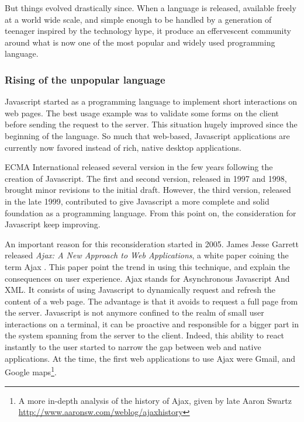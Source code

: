 But things evolved drastically since.
When a language is released, available freely at a world wide scale, and simple enough to be handled by a generation of teenager inspired by the technology hype, it produce an effervescent community around what is now one of the most popular and widely used programming language.

\subsubsection{Rising of the unpopular language}


Javascript started as a programming language to implement short interactions on web pages.
The best usage example was to validate some forms on the client before sending the request to the server.
This situation hugely improved since the beginning of the language.
So much that web-based, Javascript applications are currently now favored instead of rich, native desktop applications.

ECMA International released several version in the few years following the creation of Javascript.
The first and second version, released in 1997 and 1998, brought minor revisions to the initial draft.
However, the third version, released in the late 1999, contributed to give Javascript a more complete and solid foundation as a programming language.
From this point on, the consideration for Javascript keep improving.

An important reason for this reconsideration started in 2005.
James Jesse Garrett released \textit{Ajax: A New Approach to Web Applications}, a white paper coining the term Ajax \cite{Garrett2005}.
This paper point the trend in using this technique, and explain the consequences on user experience.
Ajax stands for Asynchronous Javascript And XML.
It consists of using Javascript to dynamically request and refresh the content of a web page.
The advantage is that it avoids to request a full page from the server.
Javascript is not anymore confined to the realm of small user interactions on a terminal, it can be proactive and responsible for a bigger part in the system spanning from the server to the client.
Indeed, this ability to react instantly to the user started to narrow the gap between web and native applications.
At the time, the first web applications to use Ajax were Gmail, and Google maps\footnote{A more in-depth analysis of the history of Ajax, given by late Aaron Swartz \url{http://www.aaronsw.com/weblog/ajaxhistory}}.

